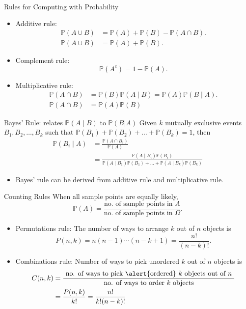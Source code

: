 \documentclass{beamer}
\newcommand{\pr}{\mathbb{P}}
\begin{document}
\begin{frame}{Rules for Computing with Probability}
    \begin{itemize}
        \item Additive rule: 
            \begin{align*}
                \pr(A\cup B) & = \pr(A)+\pr(B) - \pr(A\cap B). \\
                \pr(A\cup B) &= \pr(A)+\pr(B). \tag{\small only when A and B are ME}
            \end{align*}
        \item Complement rule: 
            $$ \pr(A^c) = 1 - \pr(A).$$
        \item Multiplicative rule:
            \begin{align*}
                \pr(A \cap B) &= \pr(B) \pr(A\mid B) = \pr(A)\pr(B \mid A). \\
                \pr(A \cap B) &= \pr(A) \pr(B) \tag{\small only when A and B are independent}
            \end{align*}
    \end{itemize}
\end{frame}

\begin{frame}{Bayes' Rule: relates $\pr(A\mid B)$ to $\pr(B | A)$}
    Given $k$ mutually exclusive events $B_1,B_2,\dots,B_k$ such that $\pr(B_1) + \pr(B_2) + \dots + \pr(B_k)=1$, then
    \begin{align*}
        \pr(B_i \mid A) & = \frac{\pr(A \cap  B_i) }{\pr(A)}\\
        & =
        \frac{\pr(A\mid B_i) \pr(B_i)}
        {\pr(A\mid B_1)\pr(B_1) + \dots + \pr(A\mid B_k) \pr(B_k)}
    \end{align*}

    \begin{itemize}
    \item Bayes' rule can be derived from additive rule and multiplicative rule.
    \end{itemize}
\end{frame}


\begin{frame}{Counting Rules}
When all sample points are equally likely,
$$\pr(A)=\frac{\text{no. of sample points in } A}{\text{no. of sample points in } \Omega}.$$

\begin{itemize}
    \item Permutations rule: The number of ways to arrange $k$ out of $n$ objects is 
    $$P(n,k) = n (n-1) \cdots (n-k+1)=\frac{n!}{(n-k)!}.$$
    \item Combinations rule: 
        Number of ways to pick \alert{unordered} $k$  out of $n$  objects is
        \begin{align*}
            C(n,k)&=\frac{\text{ no. of ways to pick \alert{ordered} $k$ objects out of $n$  }}
            {\text{no. of ways to order $k$ objects}}\\
            & = \frac{P(n,k)}{k!} = \frac{n!}{k!(n-k)!}
        \end{align*}
\end{itemize}
\end{frame}
\end{document}
